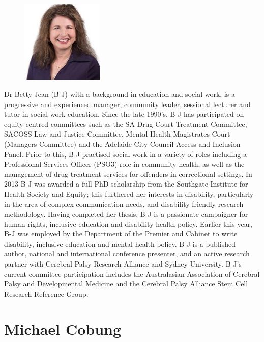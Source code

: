 \documentclass[twoside,14pt,a4paper,notitlepage]{memoir}
\begin{document}
\begin{figure}
\centering
\includegraphics[width=0.35\textwidth]{betty_jean.jpg}
\end{figure}

Dr Betty-Jean (B-J) with a background in education and social work, is a progressive and experienced manager, community leader, sessional lecturer and tutor in social work education.  Since the late 1990’s, B-J has participated on equity-centred committees such as the SA Drug Court Treatment Committee, SACOSS Law and Justice Committee, Mental Health Magistrates Court (Managers Committee) and the Adelaide City Council Access and Inclusion Panel.  Prior to this, B-J practised social work in a variety of roles including a Professional Services Officer (PSO3) role in community health, as well as the management of drug treatment services for offenders in correctional settings. In 2013 B-J was awarded a full PhD scholarship from the Southgate Institute for Health Society and Equity; this furthered her interests in disability, particularly in the area of complex communication needs, and disability-friendly research methodology. Having completed her thesis, B-J is a passionate campaigner for human rights, inclusive education and disability health policy. Earlier this year, B-J was employed by the Department of the Premier and Cabinet to write disability, inclusive education and mental health policy.  B-J is a published author, national and international conference presenter, and an active research partner with Cerebral Palsy Research Alliance and Sydney University.  B-J’s current committee participation includes the Australasian Association of Cerebral Palsy and Developmental Medicine and the Cerebral Palsy Alliance Stem Cell Research Reference Group.
\vfill


\clearpage{}
\vspace*{2cm}
\section*{Michael Cobung}
\end{document}
